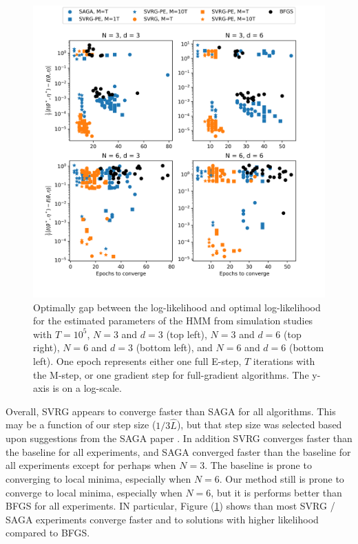 \begin{figure}
    \centering
    \includegraphics[width=6.5in]{../plt/scatter_sim.png}
    \caption{Optimally gap between the log-likelihood and optimal log-likelihood for the estimated parameters of the HMM from simulation studies with $T=10^{5}$, $N=3$ and $d=3$ (top left), $N=3$ and $d=6$ (top right), $N=6$ and $d=3$ (bottom left), and $N=6$ and $d=6$ (bottom left). One epoch represents either one full E-step, $T$ iterations with the M-step, or one gradient step for full-gradient algorithms. The y-axis is on a log-scale.}
    \label{fig:scatter_sim}
\end{figure}
%
Overall, SVRG appears to converge faster than SAGA for all algorithms. This may be a function of our step size ($1/3 \hat L$), but that step size was selected based upon suggestions from the SAGA paper \citep{Defazio:2014}. In addition SVRG converges faster than the baseline for all experiments, and SAGA converged faster than the baseline for all experiments except for perhaps when $N=3$. The baseline is prone to converging to local minima, especially when $N=6$. Our method still is prone to converge to local minima, especially when $N=6$, but it is performs better than BFGS for all experiments. IN particular, Figure (\ref{fig:scatter_sim}) shows than most SVRG / SAGA experiments converge faster and to solutions with higher likelihood compared to BFGS.

